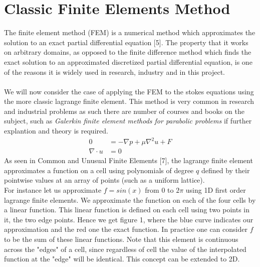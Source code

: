 \documentclass[11pt,twoside,a4paper]{article}
\begin{document}
\section{Classic Finite Elements Method}
The finite element method (FEM) is a numerical method which approximates the solution to an exact partial differential equation [5]. The property that it works on arbitrary domains, as opposed to the finite difference method which finds the exact solution to an approximated discretized partial differential equation, is one of the reasons it is widely used in research, industry and in this project.\\
\\
We will now consider the case of applying the FEM to the stokes equations using the more classic lagrange finite element. This method is very common in research and industrial problems as such there are number of courses and books on the subject, such as \textit{Galerkin finite element methods for parabolic problems} if further explantion and theory is required.\\
\begin{align}
0 &= -\nabla p + \mu \nabla^2 u + F \\
\nabla \cdot u &= 0
\end{align}
As seen in Common and Unusual Finite Elements [7], the lagrange finite element approximates a function on a cell using polynomials of degree $q$ defined by their pointwise values at an array of points (such as a uniform lattice).\\
For instance let us approximate $f = sin(x)$ from $0$ to $2 \pi$ using 1D first order lagrange finite elements. We approximate the function on each of the four cells by a linear function. This linear function is defined on each cell using two points in it, the two edge points. Hence we get figure 1, where the blue curve indicates our approximation and the red one the exact function. In practice one can consider $f$ to be the sum of these linear functions. Note that this element is continuous across the "edges" of a cell, since regardless of cell the value of the interpolated function at the "edge" will be identical. This concept can be extended to 2D.\\
\end{document}
